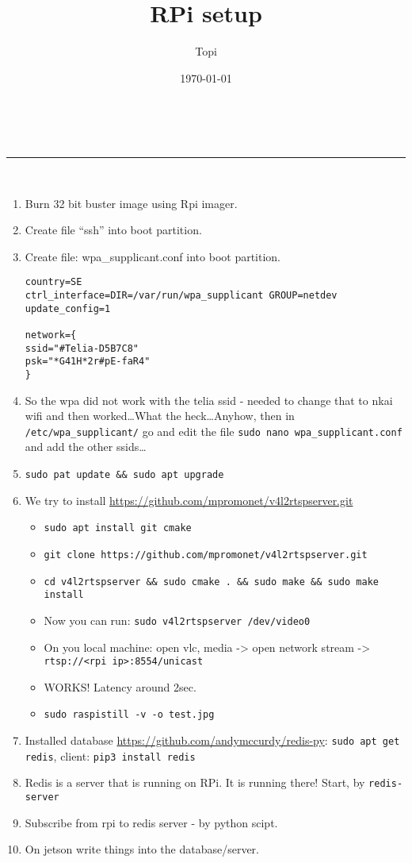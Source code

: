 \documentclass[a4paper,11pt]{article}
\makeatletter
\newcommand{\linia}{\rule{\linewidth}{0.5pt}}
\renewcommand{\maketitle}{
\begin{center}
\vspace{2ex}
{\huge \textsc{\@title}}
\vspace{1ex}
\\
\linia\\
\@author \hfill \@date
\vspace{4ex}
\end{center}
}
\makeatother
\begin{document}
\title{RPi setup}
\author{Topi}
\date{\today}

\maketitle

\begin{enumerate}
	\item Burn 32 bit buster image using Rpi imager.
	\item Create file ``ssh'' into boot partition.
	\item Create file: wpa\_supplicant.conf into boot partition.
	\begin{lstlisting}
country=SE
ctrl_interface=DIR=/var/run/wpa_supplicant GROUP=netdev
update_config=1

network={
ssid="#Telia-D5B7C8"
psk="*G41H*2r#pE-faR4"
}
\end{lstlisting}
	\item So the wpa did not work with the telia ssid - needed to change that to nkai wifi and then worked\dots What the heck\dots Anyhow, then in \texttt{/etc/wpa\_supplicant/} go and edit the file \texttt{sudo nano wpa\_supplicant.conf} and add the other ssids\dots
	\item \texttt{sudo pat update \&\& sudo apt upgrade}
	\item We try to install \url{https://github.com/mpromonet/v4l2rtspserver.git}
	\begin{itemize}
	\item \texttt{sudo apt install git cmake}
	\item \texttt{git clone https://github.com/mpromonet/v4l2rtspserver.git}
	\item \texttt{cd v4l2rtspserver \&\& sudo cmake . \&\& sudo make \&\& sudo make install}
	\item Now you can run: \texttt{sudo v4l2rtspserver /dev/video0}
	\item On you local machine: open vlc, media -> open network stream -> \texttt{rtsp://<rpi ip>:8554/unicast}
	\item WORKS! Latency around 2sec.
	\item \texttt{sudo raspistill -v -o test.jpg}
	\end{itemize}

\item Installed database \url{https://github.com/andymccurdy/redis-py}: \texttt{sudo apt get redis}, client: \texttt{pip3 install redis}
	\item Redis is a server that is running on RPi. It is running there! Start, by \texttt{redis-server}
	\item Subscribe from rpi to redis server - by python scipt.
	\item On jetson write things into the database/server. 
\end{enumerate}
%
%
\end{document}

